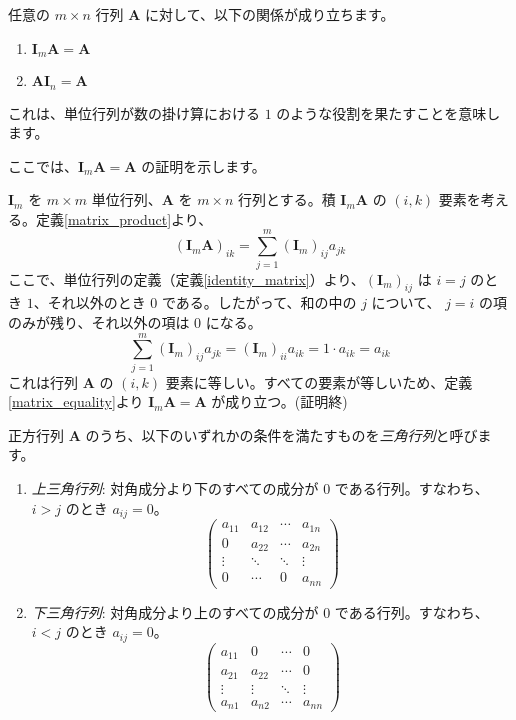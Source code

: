 \begin{thm}[単位行列の性質] \label{identity_matrix_property}
任意の $m \times n$ 行列 $\bm{A}$ に対して、以下の関係が成り立ちます。
\begin{enumerate}
\item $\bm{I}_m \bm{A} = \bm{A}$
\item $\bm{A} \bm{I}_n = \bm{A}$
\end{enumerate}
これは、単位行列が数の掛け算における $1$ のような役割を果たすことを意味します。
\begin{proof*}
ここでは、$\bm{I}_m \bm{A} = \bm{A}$ の証明を示します。\par
$\bm{I}_m$ を $m \times m$ 単位行列、$\bm{A}$ を $m \times n$ 行列とする。積 $\bm{I}_m \bm{A}$ の $(i,k)$ 要素を考える。定義\ref{matrix_product}より、
\[(\bm{I}_m \bm{A})_{ik} = \sum_{j=1}^{m} (\bm{I}_m)_{ij} a_{jk}\]
ここで、単位行列の定義（定義\ref{identity_matrix}）より、$ (\bm{I}_m)_{ij} $ は $i=j$ のとき $1$、それ以外のとき $0$ である。したがって、和の中の $j$ について、 $j=i$ の項のみが残り、それ以外の項は $0$ になる。
\[\sum_{j=1}^{m} (\bm{I}_m)_{ij} a_{jk} = (\bm{I}_m)_{ii} a_{ik} = 1 \cdot a_{ik} = a_{ik}\]
これは行列 $\bm{A}$ の $(i,k)$ 要素に等しい。すべての要素が等しいため、定義\ref{matrix_equality}より $\bm{I}_m \bm{A} = \bm{A}$ が成り立つ。(証明終)
\end{proof*}
\end{thm}

\begin{dfn}[三角行列] \label{triangular_matrix}
正方行列 $\bm{A}$ のうち、以下のいずれかの条件を満たすものを\emph{三角行列}と呼びます。
\begin{enumerate}
\item \emph{上三角行列}: 対角成分より下のすべての成分が $0$ である行列。すなわち、$i > j$ のとき $a_{ij} = 0$。
\[ \begin{pmatrix} a_{11} & a_{12} & \cdots & a_{1n} \\ 0 & a_{22} & \cdots & a_{2n} \\ \vdots & \ddots & \ddots & \vdots \\ 0 & \cdots & 0 & a_{nn} \end{pmatrix} \]
\item \emph{下三角行列}: 対角成分より上のすべての成分が $0$ である行列。すなわち、$i < j$ のとき $a_{ij} = 0$。
\[ \begin{pmatrix} a_{11} & 0 & \cdots & 0 \\ a_{21} & a_{22} & \cdots & 0 \\ \vdots & \vdots & \ddots & \vdots \\ a_{n1} & a_{n2} & \cdots & a_{nn} \end{pmatrix} \]
\end{enumerate}
\end{dfn}

